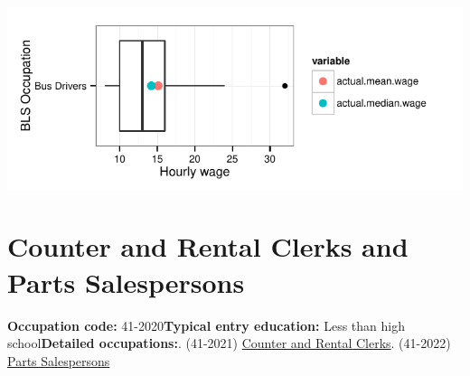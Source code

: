 \documentclass[a4paper,10pt]{article}\usepackage[]{graphicx}\usepackage[]{color}
\makeatletter
\def\maxwidth{ %
  \ifdim\Gin@nat@width>\linewidth
    \linewidth
  \else
    \Gin@nat@width
  \fi
}
\makeatother
\begin{document}
{\centering \includegraphics[width=\maxwidth]{figure/unnamed-chunk-244} 

}


\newpage\section{Counter and Rental Clerks and Parts Salespersons}\textbf{Occupation code:} 41-2020\newline\textbf{Typical entry education:} Less than high school\newline\textbf{Detailed occupations:}. (41-2021)  \href{http://www.bls.gov/oes/current/oes412021.htm}{Counter and Rental Clerks}. (41-2022)  \href{http://www.bls.gov/oes/current/oes412022.htm}{Parts Salespersons}\newline%
\end{document}
